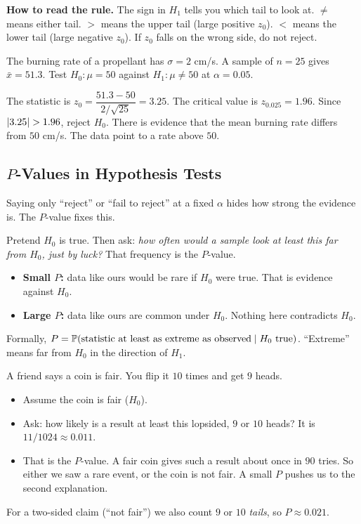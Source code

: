 \textbf{How to read the rule.} The sign in $H_1$ tells you which tail to look at. $\ne$ means either tail. $>$ means the upper tail (large positive $z_0$). $<$ means the lower tail (large negative $z_0$). If $z_0$ falls on the wrong side, do not reject.

\begin{example}\label{ex:ztest}
The burning rate of a propellant has $\sigma=2$ cm/s. A sample of $n=25$ gives $\bar{x}=51.3$. Test $H_0:\mu=50$ against $H_1:\mu\ne50$ at $\alpha=0.05$.

The statistic is $z_0=\dfrac{51.3-50}{2/\sqrt{25}}=3.25$. The critical value is $z_{0.025}=1.96$. Since $\lvert3.25\rvert>1.96$, reject $H_0$. There is evidence that the mean burning rate differs from $50$ cm/s. The data point to a rate above $50$.
\end{example}

\subsection{$P$-Values in Hypothesis Tests}

Saying only ``reject'' or ``fail to reject'' at a fixed $\alpha$ hides how strong the evidence is. The $P$-value fixes this.

\begin{definition}[$P$-value]
Pretend $H_0$ is true. Then ask: \emph{how often would a sample look at least this far from $H_0$, just by luck?} That frequency is the $P$-value.
\begin{itemize}
  \item \textbf{Small $P$:} data like ours would be rare if $H_0$ were true. That is evidence against $H_0$.
  \item \textbf{Large $P$:} data like ours are common under $H_0$. Nothing here contradicts $H_0$.
\end{itemize}
Formally, $P=\mathbb{P}(\text{statistic at least as extreme as observed}\mid H_0\text{ true})$. ``Extreme'' means far from $H_0$ in the direction of $H_1$.
\end{definition}

\begin{intuition}
A friend says a coin is fair. You flip it $10$ times and get $9$ heads.
\begin{itemize}
  \item Assume the coin is fair ($H_0$).
  \item Ask: how likely is a result at least this lopsided, $9$ or $10$ heads? It is $11/1024\approx0.011$.
  \item That is the $P$-value. A fair coin gives such a result about once in $90$ tries. So either we saw a rare event, or the coin is not fair. A small $P$ pushes us to the second explanation.
\end{itemize}
For a two-sided claim (``not fair'') we also count $9$ or $10$ \emph{tails}, so $P\approx0.021$.
\end{intuition}


